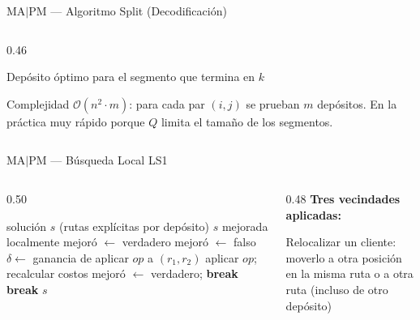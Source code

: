 \documentclass[aspectratio=169,10pt]{beamer}
\begin{document}
\begin{frame}{MA$|$PM --- Algoritmo Split (Decodificación)}
\begin{columns}[T,onlytextwidth]
\begin{column}{0.46\textwidth}
\begin{description}
        \item[\texttt{depot[k]}] Depósito óptimo para el segmento que termina en $k$
      \end{description}
      \vspace{0.3em}
      \begin{exampleblock}{Complejidad}\footnotesize
        $\mathcal{O}(n^2 \cdot m)$: para cada par $(i,j)$ se prueban $m$ depósitos. En la práctica muy rápido porque $Q$ limita el tamaño de los segmentos.
      \end{exampleblock}
    \end{column}
  \end{columns}
\end{frame}

\begin{frame}{MA$|$PM --- Búsqueda Local LS1}
  \begin{columns}[T,onlytextwidth]
    \begin{column}{0.50\textwidth}
      \begin{algorithm}[H]
        \caption{\small LS1: mejora por vecindades (\textit{first-improvement})}
        \begin{algorithmic}[1]\tiny
          \Require solución $s$ (rutas explícitas por depósito)
          \Ensure  $s$ mejorada localmente
          \State mejoró $\gets$ verdadero
            \State mejoró $\gets$ falso
                \State $\delta \gets$ ganancia de aplicar $op$ a $(r_1, r_2)$
                 
                  \State aplicar $op$; recalcular costos
                  \State mejoró $\gets$ verdadero; \textbf{break}
                \EndIf
              \EndFor
               \textbf{break} \EndIf
            \EndFor
          \EndWhile
          \State \Return $s$
        \end{algorithmic}
      \end{algorithm}
    \end{column}
    \begin{column}{0.48\textwidth}
      \textbf{Tres vecindades aplicadas:}
      \vspace{0.3em}
      \begin{description}\footnotesize
        \item[\textsc{move}] Relocalizar un cliente: moverlo a otra posición en la misma ruta o a otra ruta (incluso de otro depósito)

\end{description}
\end{column}
\end{columns}
\end{frame}
\end{document}
